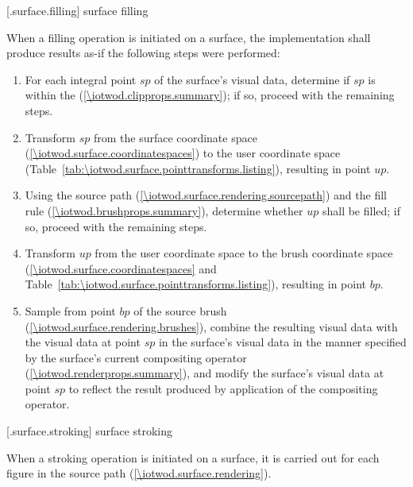  [\iotwod.surface.filling] {surface filling}

\pnum
When a filling operation is initiated on a surface, the implementation shall produce results as-if the following steps were performed:

\begin{enumerate}
\item For each integral point $sp$ of the surface's visual data, determine if $sp$ is within the  (\ref{\iotwod.clipprops.summary}); if so, proceed with the remaining steps.
\item Transform $sp$ from the surface coordinate space (\ref{\iotwod.surface.coordinatespaces}) to the user coordinate space (Table~\ref{tab:\iotwod.surface.pointtransforms.listing}), resulting in point $up$.
\item Using the source path (\ref{\iotwod.surface.rendering.sourcepath}) and the fill rule (\ref{\iotwod.brushprops.summary}), determine whether $up$ shall be filled; if so, proceed with the remaining steps.
\item Transform $up$ from the user coordinate space to the brush coordinate space (\ref{\iotwod.surface.coordinatespaces} and Table~\ref{tab:\iotwod.surface.pointtransforms.listing}), resulting in point $bp$.
\item Sample from point $bp$ of the source brush (\ref{\iotwod.surface.rendering.brushes}), combine the resulting visual data with the visual data at point $sp$ in the surface's visual data in the manner specified by the surface's current compositing operator (\ref{\iotwod.renderprops.summary}), and modify the surface's visual data at point $sp$ to reflect the result produced by application of the compositing operator.
\end{enumerate}

 [\iotwod.surface.stroking] {surface stroking}

\pnum
When a stroking operation is initiated on a surface, it is carried out for each figure in the source path (\ref{\iotwod.surface.rendering}).

